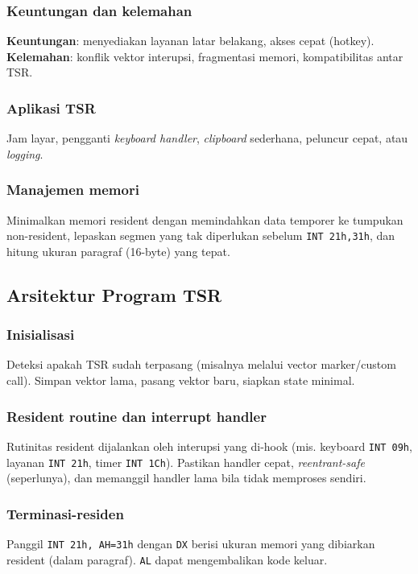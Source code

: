 \subsubsection{Keuntungan dan kelemahan}
\textbf{Keuntungan}: menyediakan layanan latar belakang, akses cepat (hotkey). \textbf{Kelemahan}: konflik vektor interupsi, fragmentasi memori, kompatibilitas antar TSR.

\subsubsection{Aplikasi TSR}
Jam layar, pengganti \textit{keyboard handler}, \textit{clipboard} sederhana, peluncur cepat, atau \textit{logging}.

\subsubsection{Manajemen memori}
Minimalkan memori resident dengan memindahkan data temporer ke tumpukan non-resident, lepaskan segmen yang tak diperlukan sebelum \texttt{INT 21h,31h}, dan hitung ukuran paragraf (16-byte) yang tepat.

\subsection{Arsitektur Program TSR}
\subsubsection{Inisialisasi}
Deteksi apakah TSR sudah terpasang (misalnya melalui vector marker/custom call). Simpan vektor lama, pasang vektor baru, siapkan state minimal.

\subsubsection{Resident routine dan interrupt handler}
Rutinitas resident dijalankan oleh interupsi yang di-hook (mis. keyboard \texttt{INT 09h}, layanan \texttt{INT 21h}, timer \texttt{INT 1Ch}). Pastikan handler cepat, \textit{reentrant-safe} (seperlunya), dan memanggil handler lama bila tidak memproses sendiri.

\subsubsection{Terminasi-residen}
Panggil \texttt{INT 21h, AH=31h} dengan \texttt{DX} berisi ukuran memori yang dibiarkan resident (dalam paragraf). \texttt{AL} dapat mengembalikan kode keluar.

